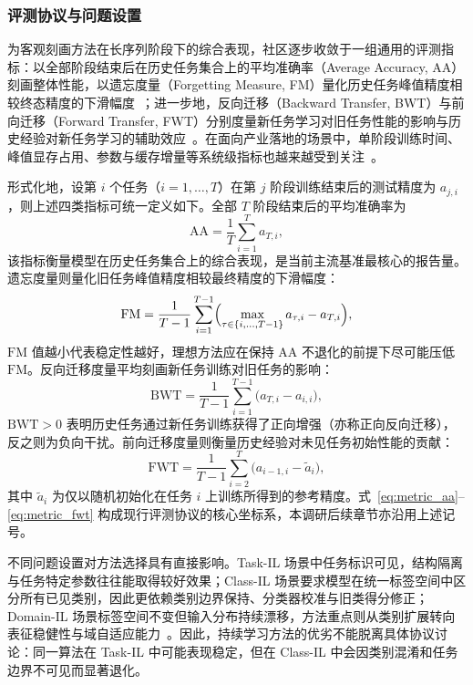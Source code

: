 \subsubsection{评测协议与问题设置}

为客观刻画方法在长序列阶段下的综合表现，社区逐步收敛于一组通用的评测指标：以全部阶段结束后在历史任务集合上的平均准确率（Average Accuracy, AA）刻画整体性能，以遗忘度量（Forgetting Measure, FM）量化历史任务峰值精度相较终态精度的下滑幅度~\citep{chaudhry2019continual}；进一步地，反向迁移（Backward Transfer, BWT）与前向迁移（Forward Transfer, FWT）分别度量新任务学习对旧任务性能的影响与历史经验对新任务学习的辅助效应~\citep{lopez2017gradient,leo2024survey}。在面向产业落地的场景中，单阶段训练时间、峰值显存占用、参数与缓存增量等系统级指标也越来越受到关注~\citep{de2021continual,wang2024survey}。

形式化地，设第 $i$ 个任务（$i=1,\ldots,T$）在第 $j$ 阶段训练结束后的测试精度为 $a_{j,i}$，则上述四类指标可统一定义如下。全部 $T$ 阶段结束后的平均准确率为
\begin{equation}
\mathrm{AA}=\frac{1}{T}\sum_{i=1}^{T}a_{T,i},
\label{eq:metric_aa}
\end{equation}
该指标衡量模型在历史任务集合上的综合表现，是当前主流基准最核心的报告量。遗忘度量则量化旧任务峰值精度相较最终精度的下滑幅度：
\begin{equation}
\mathrm{FM}=\frac{1}{T-1}\sum_{i=1}^{T-1}\Bigl(\max_{\tau\in\{i,\ldots,T-1\}}a_{\tau,i}-a_{T,i}\Bigr),
\label{eq:metric_fm}
\end{equation}
$\mathrm{FM}$ 值越小代表稳定性越好，理想方法应在保持 $\mathrm{AA}$ 不退化的前提下尽可能压低 $\mathrm{FM}$。反向迁移度量平均刻画新任务训练对旧任务的影响：
\begin{equation}
\mathrm{BWT}=\frac{1}{T-1}\sum_{i=1}^{T-1}\bigl(a_{T,i}-a_{i,i}\bigr),
\label{eq:metric_bwt}
\end{equation}
$\mathrm{BWT}>0$ 表明历史任务通过新任务训练获得了正向增强（亦称正向反向迁移），反之则为负向干扰。前向迁移度量则衡量历史经验对未见任务初始性能的贡献：
\begin{equation}
\mathrm{FWT}=\frac{1}{T-1}\sum_{i=2}^{T}\bigl(a_{i-1,i}-\tilde{a}_i\bigr),
\label{eq:metric_fwt}
\end{equation}
其中 $\tilde{a}_i$ 为仅以随机初始化在任务 $i$ 上训练所得到的参考精度。式~\eqref{eq:metric_aa}--\eqref{eq:metric_fwt} 构成现行评测协议的核心坐标系，本调研后续章节亦沿用上述记号。

不同问题设置对方法选择具有直接影响。Task-IL 场景中任务标识可见，结构隔离与任务特定参数往往能取得较好效果；Class-IL 场景要求模型在统一标签空间中区分所有已见类别，因此更依赖类别边界保持、分类器校准与旧类得分修正；Domain-IL 场景标签空间不变但输入分布持续漂移，方法重点则从类别扩展转向表征稳健性与域自适应能力~\citep{zhou2024class,wang2024survey}。因此，持续学习方法的优劣不能脱离具体协议讨论：同一算法在 Task-IL 中可能表现稳定，但在 Class-IL 中会因类别混淆和任务边界不可见而显著退化。

